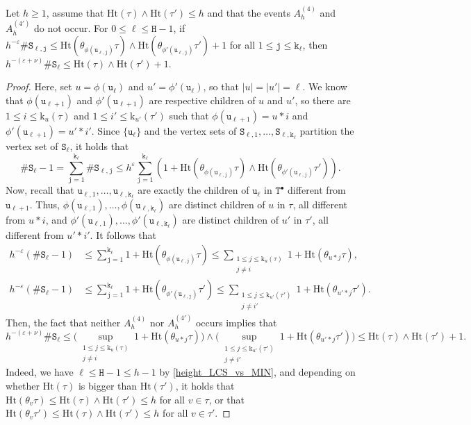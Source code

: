 \documentclass[11pt,reqno]{amsart}
\newcommand{\1}{\mathbf{1}}
\newcommand{\0}{\mathbf{0}}
\newcommand{\ttS}{\mathtt{S}}
\newcommand{\ttT}{\mathtt{T}}
\newcommand{\ttH}{\mathtt{H}}
\newcommand{\ttj}{\mathtt{j}}
\newcommand{\ttk}{\mathtt{k}}
\newcommand{\ttu}{\mathtt{u}}
\newcommand{\Ht}{\mathrm{Ht}}
\newcommand{\rk}{\mathrm{k}}
\newcommand{\eps}{\varepsilon}
\begin{document}
\begin{lem}
\label{lem:A_cases}
Let $h\geq 1$, assume that $\Ht(\tau)\wedge\Ht(\tau')\leq h$ and that the events $A_h^{(4)}$ and $A_h^{(4')}$ do not occur. For $0\leq \ell\leq \ttH-1$, if $h^{-\varepsilon}\# \ttS_{\ell,\ttj} \leq \Ht(\theta_{\phi(\ttu_{\ell,\ttj})}\tau)\wedge \Ht(\theta_{\phi'(\ttu_{\ell,\ttj})}\tau')+1$ for all $1\leq \ttj\leq \ttk_\ell$, then $h^{-(\eps+\nu)}\# \ttS_\ell\leq  \Ht(\tau)\wedge\Ht(\tau')+1$.
\end{lem}

\begin{proof}
Here, set $u=\phi(\ttu_\ell)$ and $u'=\phi'(\ttu_\ell)$, so that $|u|=|u'|=\ell$. We know that $\phi(\ttu_{\ell+1})$ and $\phi'(\ttu_{\ell+1})$ are respective children of $u$ and $u'$, so there are $1\leq i\leq \rk_u(\tau)$ and $1\leq i'\leq \rk_{u'}(\tau')$ such that $\phi(\ttu_{\ell+1})=u*i$ and $\phi'(\ttu_{\ell+1})=u'*i'$. Since $\{\ttu_\ell\}$ and the vertex sets of $\ttS_{\ell,1},\ldots,\ttS_{\ell,\ttk_\ell}$ partition the vertex set of $\ttS_\ell$, it holds that
\[\#\ttS_{\ell}-1=\sum_{\ttj=1}^{\ttk_\ell}\# \ttS_{\ell,\ttj}\leq h^\varepsilon\sum_{\ttj=1}^{\ttk_\ell}\left(1+\Ht(\theta_{\phi(\ttu_{\ell,\ttj})}\tau)\wedge \Ht(\theta_{\phi'(\ttu_{\ell,\ttj})}\tau') \right).\]
Now, recall that $\ttu_{\ell,1},\ldots,\ttu_{\ell,\ttk_\ell}$ are exactly the children of $\ttu_\ell$ in $\ttT^\bullet$ different from $\ttu_{\ell+1}$. Thus, $\phi(\ttu_{\ell,1}),\ldots,\phi(\ttu_{\ell,\ttk_\ell})$ are distinct children of $u$ in $\tau$, all different from $u*i$, and $\phi'(\ttu_{\ell,1}),\ldots,\phi'(\ttu_{\ell,\ttk_\ell})$ are distinct children of $u'$ in $\tau'$, all different from $u'*i'$. It follows that
\begin{align*}
h^{-\varepsilon}(\#\ttS_\ell-1)&\leq \sum_{\ttj=1}^{\ttk_\ell}1+\Ht(\theta_{\phi(\ttu_{\ell,\ttj})}\tau)\leq  \!\!\sum_{\substack{1\leq j\leq \rk_u(\tau)\\ j\neq i}}\!\! 1+\Ht(\theta_{u*j}\tau),\\
h^{-\varepsilon}(\#\ttS_\ell-1)&\leq \sum_{\ttj=1}^{\ttk_\ell}1+\Ht(\theta_{\phi'(\ttu_{\ell,\ttj})}\tau')\leq  \!\!\sum_{\substack{1\leq j\leq \rk_{u'}(\tau')\\ j\neq i'}}\!\! 1+\Ht(\theta_{u'*j}\tau').
\end{align*}
Then, the fact that neither $A_h^{(4)}$ nor $A_h^{(4')}$ occurs implies that
\[h^{-(\eps+\nu)}\#\ttS_\ell \leq  \Big(\sup_{\substack{1\leq j\leq \rk_u(\tau) \\ j\neq i}}\!\! 1+\Ht(\theta_{u*j}\tau)\Big)\wedge \Big(\sup_{\substack{1\leq j\leq \rk_{u'}(\tau') \\ j\neq i'}}\!\! 1+\Ht(\theta_{u'*j}\tau') \Big)\leq  \Ht(\tau)\wedge\Ht(\tau')+1.\]
Indeed, we have $\ell\leq \ttH-1\leq h-1$ by \eqref{height_LCS_vs_MIN}, and depending on whether $\Ht(\tau)$ is bigger than $\Ht(\tau')$, it holds that $\Ht(\theta_v\tau)\leq \Ht(\tau)\wedge \Ht(\tau')\leq h$ for all $v\in\tau$, or that $\Ht(\theta_v\tau')\leq \Ht(\tau)\wedge \Ht(\tau')\leq h$ for all $v\in\tau'$.
\end{proof}
\end{document}
